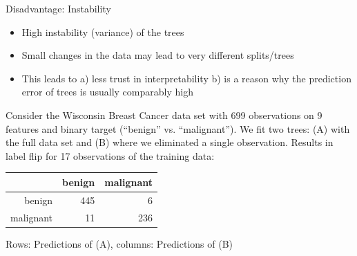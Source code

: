 \documentclass[11pt,compress,t,notes=noshow, xcolor=table]{beamer}
\begin{document}
 \begin{framev}{Disadvantage: Instability}
 \begin{itemize}
 \item High instability (variance) of the trees
 \item Small changes in the data may lead to very different splits/trees
 \item This leads to a) less trust in interpretability b) is a reason why the prediction error of trees is usually comparably high
 \end{itemize}

Consider the Wisconsin Breast Cancer data set with 699 observations on 9 features and binary target (\enquote{benign} vs. \enquote{malignant}). We fit two trees: (A) with the full data set and (B) where we eliminated a single observation. Results in label flip for 17 observations of the training data:

\begin{table}[ht]
\centering
\begin{tabular}{rrr}
  \hline
 & benign & malignant \\ 
  \hline
benign & 445 &   6 \\ 
  malignant &  11 & 236 \\ 
   \hline
\end{tabular}
\end{table}

Rows: Predictions of (A), columns: Predictions of (B) %



\end{framev}
\end{document}
